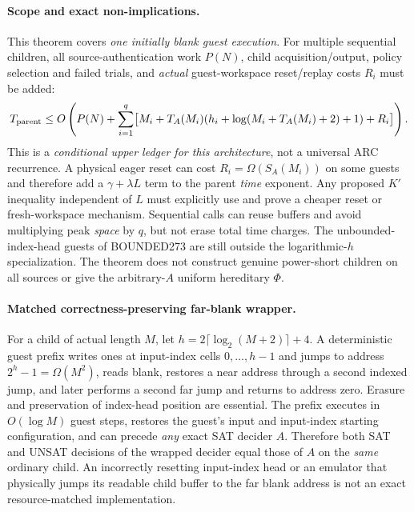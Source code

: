 \documentclass[11pt]{article}
\begin{document}
\paragraph{Scope and exact non-implications.}
This theorem covers \emph{one initially blank guest execution}. For multiple sequential children, all source-authentication work $P(N)$, child acquisition/output, policy selection and failed trials, and \emph{actual} guest-workspace reset/replay costs $R_i$ must be added:
\[
T_{\rm parent}\le O\left(P(N)+\sum_{i=1}^{q}
 \bigl[M_i+T_A(M_i)(h_i+\log(M_i+T_A(M_i)+2)+1)+R_i\bigr]\right).
\]
This is a \emph{conditional upper ledger for this architecture}, not a universal ARC recurrence. A physical eager reset can cost $R_i=\Omega(S_A(M_i))$ on some guests and therefore add a $\gamma+\lambda L$ term to the parent \emph{time} exponent. Any proposed $K'$ inequality independent of $L$ must explicitly use and prove a cheaper reset or fresh-workspace mechanism. Sequential calls can reuse buffers and avoid multiplying peak \emph{space} by $q$, but not erase total time charges. The unbounded-index-head guests of BOUNDED273 are still outside the logarithmic-$h$ specialization. The theorem does not construct genuine power-short children on all sources or give the arbitrary-$A$ uniform hereditary $\Phi$.

\paragraph{Matched correctness-preserving far-blank wrapper.}
For a child of actual length $M$, let $h=2\lceil\log_2(M+2)\rceil+4$. A deterministic guest prefix writes ones at input-index cells $0,\dots,h-1$ and jumps to address $2^h-1=\Omega(M^2)$, reads blank, restores a near address through a second indexed jump, and later performs a second far jump and returns to address zero. Erasure and preservation of index-head position are essential. The prefix executes in $O(\log M)$ guest steps, restores the guest's input and input-index starting configuration, and can precede \emph{any} exact SAT decider $A$. Therefore both SAT and UNSAT decisions of the wrapped decider equal those of $A$ on the \emph{same} ordinary child. An incorrectly resetting input-index head or an emulator that physically jumps its readable child buffer to the far blank address is not an exact resource-matched implementation.
\end{document}
